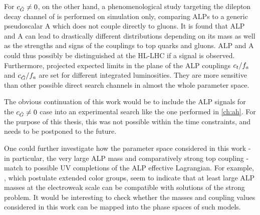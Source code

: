 For $c_{\tilde{G}} \neq 0$, on the other hand, a phenomenological study targeting the dilepton decay channel of \ttbar is performed on simulation only, comparing ALPs to a generic pseudoscalar A which does not couple directly to gluons. It is found that ALP and A can lead to drastically different \mtt distributions depending on its mass as well as the strengths and signs of the couplings to top quarks and gluons. ALP and A could thus possibly be distinguished at the HL-LHC if a signal is observed. Furthermore, projected expected limits in the plane of the ALP couplings $c_t/f_a$ and $c_{\tilde{G}}/f_a$ are set for different integrated luminosities. They are more sensitive than other possible direct search channels in almost the whole parameter space.

\newpage

The obvious continuation of this work would be to include the ALP signals for the $c_{\tilde{G}} \neq 0$ case into an experimental search like the one performed in \cref{ch:ah}. For the purpose of this thesis, this was not possible within the time constraints, and needs to be postponed to the future. 

One could further investigate how the parameter space considered in this work - in particular, the very large ALP mass and comparatively strong top coupling - match to possible UV completions of the ALP effective Lagrangian. For example, , which postulate extended color groups, seem to indicate that at least large ALP masses at the electroweak scale can be compatible with solutions of the strong \CP problem. It would be interesting to check whether the masses and coupling values considered in this work can be mapped into the phase spaces of such models. %